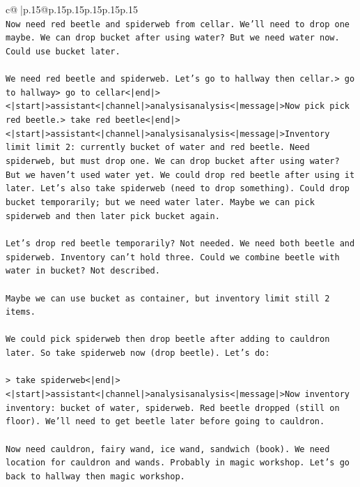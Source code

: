 \documentclass{article}
\begin{document}
{\begin{supertabular}{c@{$\;$}|p{.15\linewidth}@{}p{.15\linewidth}p{.15\linewidth}p{.15\linewidth}p{.15\linewidth}p{.15\linewidth}}
{{{\\ 
\texttt{Now need red beetle and spiderweb from cellar. We'll need to drop one maybe. We can drop bucket after using water? But we need water now. Could use bucket later.} \\
\\ 
\texttt{We need red beetle and spiderweb. Let's go to hallway then cellar.> go to hallway> go to cellar<|end|><|start|>assistant<|channel|>analysisanalysis<|message|>Now pick pick red beetle.> take red beetle<|end|><|start|>assistant<|channel|>analysisanalysis<|message|>Inventory limit limit 2: currently bucket of water and red beetle. Need spiderweb, but must drop one. We can drop bucket after using water? But we haven't used water yet. We could drop red beetle after using it later. Let's also take spiderweb (need to drop something). Could drop bucket temporarily; but we need water later. Maybe we can pick spiderweb and then later pick bucket again.} \\
\\ 
\texttt{Let's drop red beetle temporarily? Not needed. We need both beetle and spiderweb. Inventory can't hold three. Could we combine beetle with water in bucket? Not described.} \\
\\ 
\texttt{Maybe we can use bucket as container, but inventory limit still 2 items.} \\
\\ 
\texttt{We could pick spiderweb then drop beetle after adding to cauldron later. So take spiderweb now (drop beetle). Let's do:} \\
\\ 
\texttt{> take spiderweb<|end|><|start|>assistant<|channel|>analysisanalysis<|message|>Now inventory inventory: bucket of water, spiderweb. Red beetle dropped (still on floor). We'll need to get beetle later before going to cauldron.} \\
\\ 
\texttt{Now need cauldron, fairy wand, ice wand, sandwich (book). We need location for cauldron and wands. Probably in magic workshop. Let's go back to hallway then magic workshop.} \\
\\ 
}}}
\end{supertabular}}
\end{document}
